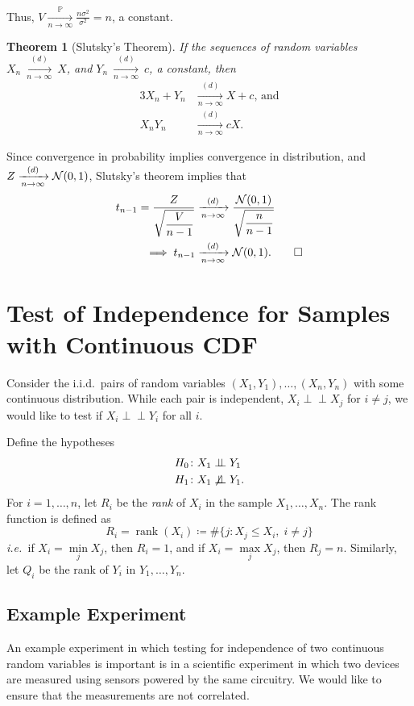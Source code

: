 \documentclass[letterpaper, reqno]{amsart}
\newtheorem{theorem}{Theorem}[section]
\numberwithin{equation}{section}
\newcommand{\ie}{\emph{i.e.\ }}
\newcommand{\ddfrac}[2]{\frac{\displaystyle #1}{\displaystyle #2}}
\newcommand{\N}[2]{\mathcal{N}\mleft( #1, #2 \mright)}
\newcommand{\indep}{\perp \!\!\! \perp}  %
\newcommand{\nindep}{\centernot\indep}
\newcommand{\iid}{i.i.d.}
\newcommand{\Plim}{\xrightarrow[n \to \infty]{\mathbb{P}}}
\newcommand{\Dlim}{\xrightarrow[n \to \infty]{(d)}}
\begin{document}
Thus, $V \Plim \frac{n \sigma^2}{\sigma^2} = n$, a constant. 

\begin{theorem}[Slutsky's Theorem]
  If the sequences of random variables $X_n~\Dlim~X$, and $Y_n~\Dlim~c$,
  a constant, then
  \begin{alignat*}{3}
    X_n + Y_n &\Dlim X + c \text{, and} \\
    X_n Y_n &\Dlim cX.
  \end{alignat*}
\end{theorem}

Since convergence in probability implies convergence in distribution, and $Z
\Dlim \N{0}{1}$, Slutsky's theorem implies that
\begin{align*}
  t_{n-1} = \ddfrac{Z}{\sqrt{\frac{V}{n-1}}} 
        &\Dlim \ddfrac{\N{0}{1}}{\sqrt{\frac{n}{n-1}}} \\
        \implies t_{n-1} &\Dlim \N{0}{1}.  \qed
\end{align*}

\clearpage
\section{Test of Independence for Samples with Continuous CDF}
Consider the \iid\ pairs of random variables $(X_1, Y_1), \dots, (X_n, Y_n)$
with some continuous distribution. While each pair is independent, $X_i \indep
X_j$ for $i \ne j$, we would like to test if $X_i \indep Y_i$ for all $i$.

Define the hypotheses
\begin{align*}
  H_0 &\colon X_1 \indep Y_1 \\
  H_1 &\colon X_1 \nindep Y_1.
\end{align*}
For $i = 1, \dots, n$, let $R_i$ be the \emph{rank} of $X_i$ in the sample $X_1,
\dots, X_n$. The rank function is defined as
\begin{equation} \label{eq:R_i}
  R_i = \operatorname{rank}(X_i) \coloneqq \#\{j \colon X_j \le X_i, \; i \ne j\} 
\end{equation}
\ie if $X_i = \min\limits_j X_j$, then $R_i = 1$, and if $X_i = \max\limits_j
X_j$, then $R_j = n$. 
Similarly, let $Q_i$ be the rank of $Y_i$ in $Y_1, \dots, Y_n$.

\subsection{Example Experiment}
An example experiment in which testing for independence of two continuous random
variables is important is in a scientific experiment in which two devices are
measured using sensors powered by the same circuitry. We would like to ensure
that the measurements are not correlated.
\end{document}
